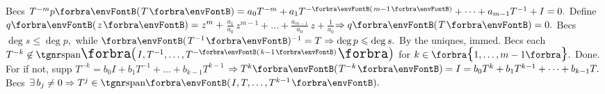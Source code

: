 Becs $T^{-m}{p\Par{T}}=a_0T^{-m}+a_1T^{-\SmallPar{m-1}}+\dots+a_{m-1}{T^{-1}}+I=0.$\parSol{}
Define $q\Par{z}=z^m+{}${\Large$\frac{a_1}{a_0}$}$\,z^{m-1}+\dots+{}${\Large$\frac{a_{m-1}}{a_0}$}$\,z+{}${\Large$\frac{1}{a_0}$}$\Rightarrow q\Par{T}=0.$\parSol{}
Becs $\deg s\leqslant\deg p,$ while $\Par{T^{-1}}{^{-1}}=T\Rightarrow\deg p\leqslant\deg s.$ By the uniqnes, immed.\PfEnd\vspace{4pt}\parSol{}
\Or Becs each $T^{-k}\not\in\Span[\BigPar]{I,T^{-1},\dots,T^{-\SmallPar{k-1}}}$ for $k\in\Bra{1,\dots,m-1}.$ Done.\parSol{}
For if not, supp $T^{-k}=b_0 I+b_1 T^{-1}+\dots+b_{k-1}T^{k-1}$\parSol{}
$\Rightarrow T^k\Par{T^{-k}}=I=b_0 T^k+b_1 T^{k-1}+\dots+b_{k-1}T.$ Becs $\exists\,b_j\neq 0\Rightarrow T^j\in\Span{I,T,\dots,T^{k-1}}.$\PfEnd
\SepLine



